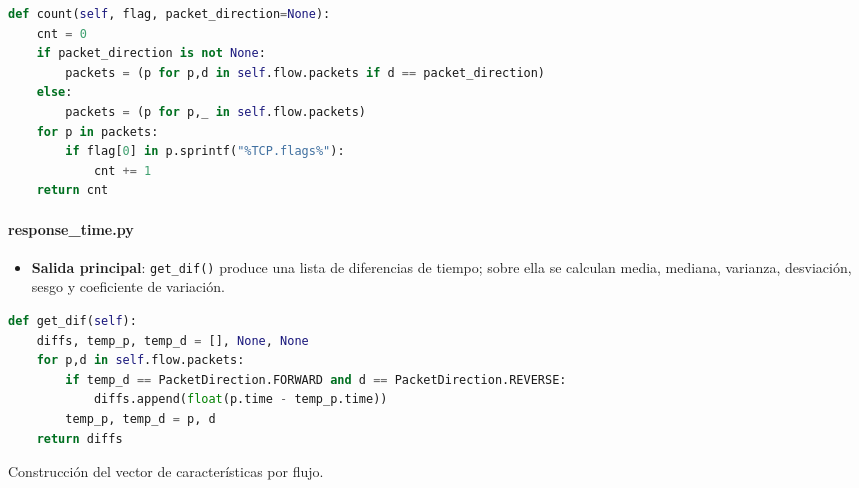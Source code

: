 \begin{lstlisting}[language=Python,caption={Conteo de flags TCP (extracto)},label=List.FlagCount]
def count(self, flag, packet_direction=None):
    cnt = 0
    if packet_direction is not None:
        packets = (p for p,d in self.flow.packets if d == packet_direction)
    else:
        packets = (p for p,_ in self.flow.packets)
    for p in packets:
        if flag[0] in p.sprintf("%TCP.flags%"):
            cnt += 1
    return cnt
\end{lstlisting}

\paragraph{response\_time.py}

\begin{itemize}
  \item \textbf{Salida principal}: \texttt{get\_dif()} produce una lista de diferencias de tiempo; sobre ella se calculan media, mediana, varianza, desviación, sesgo y coeficiente de variación.
\end{itemize}

\begin{lstlisting}[language=Python,caption={Diferencias de tiempo solicitud-respuesta (extracto)},label=List.ResponseTime]
def get_dif(self):
    diffs, temp_p, temp_d = [], None, None
    for p,d in self.flow.packets:
        if temp_d == PacketDirection.FORWARD and d == PacketDirection.REVERSE:
            diffs.append(float(p.time - temp_p.time))
        temp_p, temp_d = p, d
    return diffs
\end{lstlisting}

\begin{algorithm}[H]
\DontPrintSemicolon
\SetAlgoLined
{}
\caption{Construcción del vector de características por flujo.}
\label{alg:assemble_features}
\end{algorithm}

